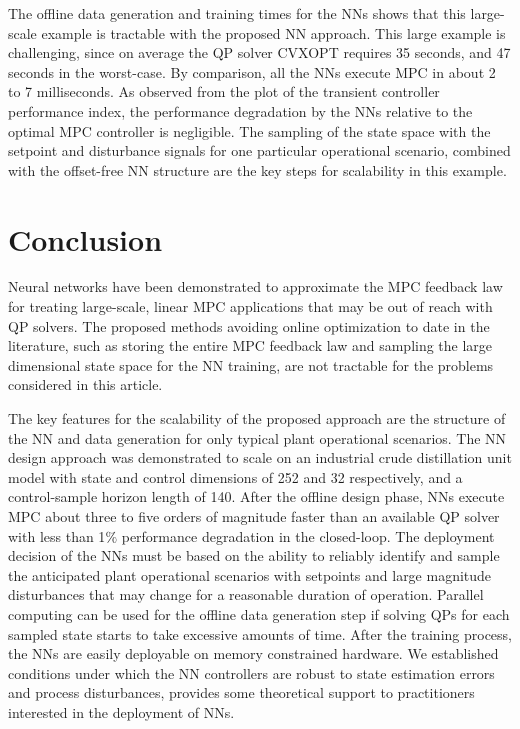 \documentclass[preprint,5p, twocolumn, authoryear]{elsarticle}
\begin{document}
The offline data generation and training times 
for the NNs shows that this large-scale example
is tractable with the proposed NN approach.
This large example is challenging, 
since on average the QP solver CVXOPT requires 
35 seconds, and 
47 seconds in the worst-case. By comparison,  
all the NNs execute MPC in about 2 
to 7 milliseconds.
As observed from the plot of the transient controller 
performance index, the performance 
degradation by the NNs relative to 
the optimal MPC controller is negligible.
The sampling of the state space with 
the setpoint and disturbance signals
for one particular operational scenario,
combined with the offset-free NN structure
are the key steps for scalability in this example. 

\section{Conclusion} \label{sec:conclusion}
Neural networks have been demonstrated 
to approximate the MPC feedback law
for treating large-scale, linear MPC applications
that may be out of reach with QP solvers. 
The proposed methods avoiding online optimization
to date in the literature, such as storing 
the entire MPC feedback law 
and sampling the large dimensional state space 
for the NN training, are not tractable for the problems 
considered in this article.

The key features for the scalability of the proposed approach 
are the structure of the NN and data generation for only
typical plant operational scenarios. 
The NN design approach was demonstrated to scale on an
industrial crude distillation unit model with state and
control dimensions of 252 and 32 respectively, and 
a control-sample horizon length of 140. 
After the offline design phase, NNs execute MPC 
about three to five orders of magnitude faster than an 
available QP solver 
with less than 1$\%$ performance degradation in the closed-loop.
The deployment decision of the NNs 
must be based on the ability to reliably identify 
and sample the anticipated plant operational scenarios 
with setpoints and large magnitude disturbances
that may change for a reasonable duration of operation.
Parallel computing can be used for
the offline data generation step if
solving QPs for each sampled state starts to take 
excessive amounts of time.
After the training process, 
the NNs are easily deployable on memory constrained 
hardware. We established conditions under which the 
NN controllers are robust to state estimation errors 
and process disturbances,
provides some theoretical support 
to practitioners interested in the deployment of NNs. 
\end{document}
